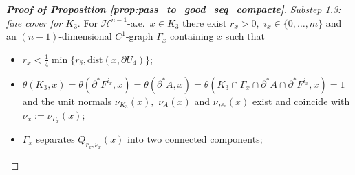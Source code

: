 \documentclass[reqno]{amsart}
\numberwithin{equation}{section}
\theoremstyle{plain}
\theoremstyle{definition}
\newcommand{\cH}{\mathcal{H}}
\newcommand{\p}{\partial}
\newcommand{\dist}{\mathrm{dist}}
\begin{document}
\begin{proof}[\textbf{Proof of Proposition \ref{prop:pass_to_good_seq_compacte}}]
{\it Substep 1.3: fine cover for $K_3.$} For $\cH^{n-1}$-a.e.\  $x\in K_3$ there exist $r_x>0,$ $i_x\in \{0,\ldots,m\}$ and an $(n-1)$-dimensional $C^1$-graph $\Gamma_x$ containing $x$ such that 
\begin{itemize}
%
\item[($\rm a_{3.1}$)]  $r_x<\frac{1}{4}\min\{r_\delta,\dist(x,\p U_4)\};$

\item[($\rm a_{3.2}$)] $\theta(K_3,x) = \theta(\p^*F^{i_x},x) = \theta(\p^*A,x) = \theta(K_3\cap \Gamma_x\cap \p^*A \cap \p^*F^{i_x},x) = 1$ and the unit normals $\nu_{K_3}(x),$ $\nu_A(x)$ and $\nu_{F^{i_x}}(x)$ exist and coincide with $\nu_x:=\nu_{\Gamma_x}(x);$

\item[($\rm a_{3.3}$)] $\Gamma_x$ separates $Q_{r_x,\nu_x}(x)$ into two connected components;


\end{itemize}
\end{proof}
\end{document}

